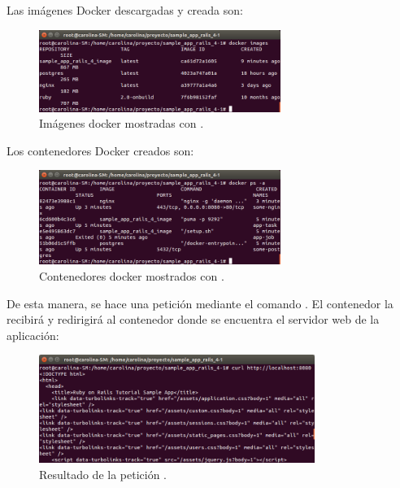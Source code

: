 Las imágenes Docker descargadas y creada son:

\begin{figure}[H]
\centering
\includegraphics[width=0.7\textwidth]{images/figures/dockerimages.png}
\caption{Imágenes docker mostradas con .}
\end{figure}

Los contenedores Docker creados son:

\begin{figure}[H]
\centering
\includegraphics[width=0.7\textwidth]{images/figures/dockerps.png}
\caption{Contenedores docker mostrados con .}
\end{figure}

De esta manera, se hace una petición mediante el comando . El contenedor  la recibirá y redirigirá al contenedor  donde se encuentra el servidor web de la aplicación:


\begin{figure}[H]
\centering
\includegraphics[width=0.8\textwidth]{images/figures/curldocker.png}
\caption{Resultado de la petición .}
\end{figure}

